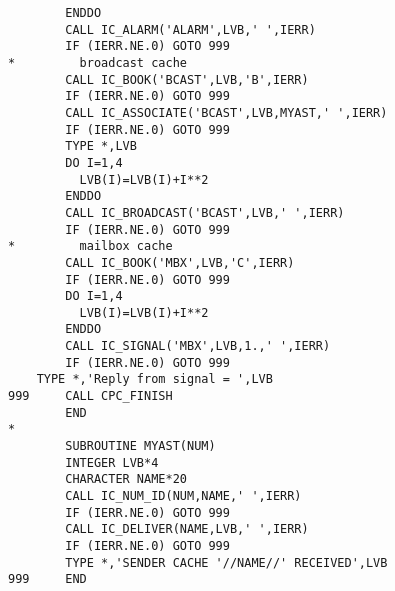 \begin{verbatim}
        ENDDO
        CALL IC_ALARM('ALARM',LVB,' ',IERR)
        IF (IERR.NE.0) GOTO 999
*         broadcast cache
        CALL IC_BOOK('BCAST',LVB,'B',IERR)
        IF (IERR.NE.0) GOTO 999
        CALL IC_ASSOCIATE('BCAST',LVB,MYAST,' ',IERR)
        IF (IERR.NE.0) GOTO 999
        TYPE *,LVB
        DO I=1,4
          LVB(I)=LVB(I)+I**2
        ENDDO
        CALL IC_BROADCAST('BCAST',LVB,' ',IERR)
        IF (IERR.NE.0) GOTO 999
*         mailbox cache
        CALL IC_BOOK('MBX',LVB,'C',IERR)
        IF (IERR.NE.0) GOTO 999
        DO I=1,4
          LVB(I)=LVB(I)+I**2
        ENDDO
        CALL IC_SIGNAL('MBX',LVB,1.,' ',IERR)
        IF (IERR.NE.0) GOTO 999
	TYPE *,'Reply from signal = ',LVB
999     CALL CPC_FINISH
        END
*
        SUBROUTINE MYAST(NUM)
        INTEGER LVB*4
        CHARACTER NAME*20
        CALL IC_NUM_ID(NUM,NAME,' ',IERR)
        IF (IERR.NE.0) GOTO 999
        CALL IC_DELIVER(NAME,LVB,' ',IERR)
        IF (IERR.NE.0) GOTO 999
        TYPE *,'SENDER CACHE '//NAME//' RECEIVED',LVB
999     END
\end{verbatim}


\bye
